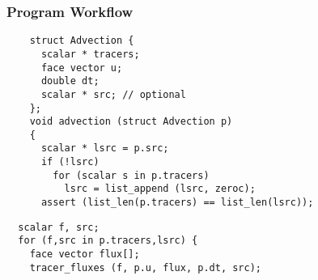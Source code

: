 \documentclass[a4paper]{article}
\newcommand{\para}[1]{\textbf{\emph{\textcolor{para}{#1}}}}
\begin{document}
\subsubsection{Program Workflow}
\begin{multicols}{2}
  \columnbreak
  \begin{verbatim}
    struct Advection {
      scalar * tracers;
      face vector u;
      double dt;
      scalar * src; // optional
    };
    void advection (struct Advection p)
    {
      scalar * lsrc = p.src;
      if (!lsrc)
        for (scalar s in p.tracers)
          lsrc = list_append (lsrc, zeroc);
      assert (list_len(p.tracers) == list_len(lsrc));
  \end{verbatim}
\end{multicols}

\begin{center}
\end{center}

\begin{multicols}{2}
  \columnbreak
  \begin{verbatim}
  scalar f, src;
  for (f,src in p.tracers,lsrc) {
    face vector flux[];
    tracer_fluxes (f, p.u, flux, p.dt, src);
  \end{verbatim}
\end{multicols}
\end{document}
